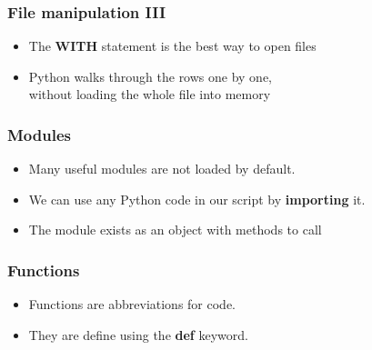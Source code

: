 \documentclass[]{beamer}
\begin{document}

\begin{frame}
\frametitle{File manipulation III}

\begin{itemize}
\item The \textbf{WITH} statement is the best way to open files
\item Python walks through the rows one by one, \\ without loading the whole file into memory
\end{itemize}

\pause

\begin{block}{}

\end{block}

\end{frame}


\begin{frame}
\frametitle{Modules}

\begin{itemize}
\item Many useful modules are not loaded by default.
\item We can use any Python code in our script by \textbf{importing} it.
\item The module exists as an object with methods to call
\end{itemize}

\pause

\begin{block}{}

\end{block}

\end{frame}


\begin{frame}
\frametitle{Functions}

\begin{itemize}
\item Functions are abbreviations for code.
\item They are define using the \textbf{def} keyword.
\end{itemize}

\pause

\begin{block}{}

\end{block}

\end{frame}
\end{document}

